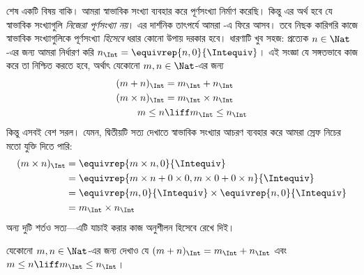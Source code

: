 \documentclass[../../../include/open-logic-section]{subfiles}
\begin{document}
শেষ একটি বিষয় বাকি। আমরা স্বাভাবিক সংখ্যা ব্যবহার করে পূর্ণসংখ্যা নির্মাণ করেছি। কিন্তু এর অর্থ হবে যে স্বাভাবিক সংখ্যাগুলি \emph{নিজেরা পূর্ণসংখ্যা নয়}। এর দার্শনিক তাৎপর্যে আমরা -এ ফিরে আসব। তবে নিছক কারিগরি কাজে স্বাভাবিক সংখ্যাগুলিকে পূর্ণসংখ্যা \emph{হিসেবে} ধরার কোনো উপায় দরকার হবে। ধারণাটি খুব সহজ: প্রত্যেক $n \in \Nat$-এর জন্য আমরা নির্ধারণ করি $n_\Int = \equivrep{n, 0}{\Intequiv}$। এই সংজ্ঞা যে সঙ্গতভাবে কাজ করে তা নিশ্চিত করতে হবে, অর্থাৎ যেকোনো $m, n
\in \Nat$-এর জন্য
\begin{align*}
	(m + n)_\Int &= m_\Int + n_\Int\\
	(m \times n)_\Int &= m_\Int \times n_\Int\\
	m \leq n &\liff m_\Int \leq n_\Int
\end{align*}
কিন্তু এসবই বেশ সরল। যেমন, দ্বিতীয়টি সত্য দেখাতে স্বাভাবিক সংখ্যার আচরণ ব্যবহার করে আমরা স্রেফ নিচের মতো যুক্তি দিতে পারি:
	\begin{align*}
		(m \times n)_\Int  &= \equivrep{m \times n, 0}{\Intequiv} \\
		&= \equivrep{m \times n + 0 \times 0, m \times 0 + 0 \times n}{\Intequiv} \\
		&= \equivrep{m, 0}{\Intequiv} \times \equivrep{n, 0}{\Intequiv} \\
		&= m_\Int \times n_\Int
	\end{align*}
অন্য দুটি শর্তও সত্য—এটি যাচাই করার কাজ অনুশীলন হিসেবে রেখে দিই।
\begin{prob}
	যেকোনো $m, n \in \Nat$-এর জন্য দেখাও যে $(m + n)_\Int = m_\Int + n_\Int$ এবং $m \leq n \liff m_\Int \leq n_\Int$।
\end{prob}
\end{document}
